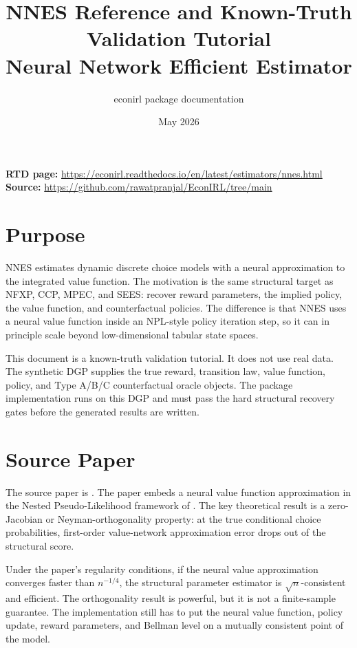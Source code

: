 \documentclass[10pt]{article}
\title{NNES Reference and Known-Truth Validation Tutorial\\[3pt]
\large Neural Network Efficient Estimator}
\author{econirl package documentation}
\date{May 2026}
\begin{document}
\maketitle

\begin{center}
\small
\textbf{RTD page:}
\url{https://econirl.readthedocs.io/en/latest/estimators/nnes.html}
\quad
\textbf{Source:}
\url{https://github.com/rawatpranjal/EconIRL/tree/main}
\end{center}

\section{Purpose}

NNES estimates dynamic discrete choice models with a neural approximation to
the integrated value function. The motivation is the same structural target as
NFXP, CCP, MPEC, and SEES: recover reward parameters, the implied policy, the
value function, and counterfactual policies. The difference is that NNES uses a
neural value function inside an NPL-style policy iteration step, so it can in
principle scale beyond low-dimensional tabular state spaces.

This document is a known-truth validation tutorial. It does not use real data.
The synthetic DGP supplies the true reward, transition law, value function,
policy, and Type A/B/C counterfactual oracle objects. The package
implementation runs on this DGP and must pass the hard structural recovery
gates before the generated results are written.

\section{Source Paper}

The source paper is \citet{nguyen2025}. The paper embeds a neural value
function approximation in the Nested Pseudo-Likelihood framework of
\citet{aguirregabiriaMira2002}. The key theoretical result is a zero-Jacobian
or Neyman-orthogonality property: at the true conditional choice
probabilities, first-order value-network approximation error drops out of the
structural score.

Under the paper's regularity conditions, if the neural value approximation
converges faster than \(n^{-1/4}\), the structural parameter estimator is
\(\sqrt n\)-consistent and efficient. The orthogonality result is powerful,
but it is not a finite-sample guarantee. The implementation still has to put
the neural value function, policy update, reward parameters, and Bellman level
on a mutually consistent point of the model.
\end{document}

